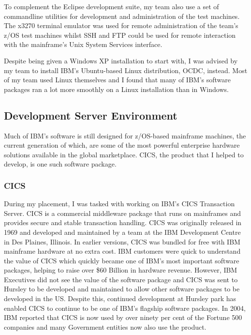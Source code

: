 \documentclass[12pt,a4paper]{article}
\begin{document}
To complement the Eclipse development suite, my team also use a set of
commandline utilities for development and administration of the test machines.
The x3270 \cite{x3270Site} terminal emulator was used for remote administration
of the team's z/OS test machines whilst SSH and FTP could be used for remote
interaction with the mainframe's Unix System Services interface.

Despite being given a Windows XP installation to start with, I was advised by my
team to install IBM's Ubuntu-based Linux distribution, OCDC, instead. Most of my
team used Linux themselves and I found that many of IBM's software packages ran
a lot more smoothly on a Linux installation than in Windows.

\subsection{Development Server Environment}
%
Much of IBM's software is still designed for z/OS-based mainframe machines, the 
current generation of which, are some of the most powerful enterprise hardware
solutions available in the global marketplace. CICS, the product that I helped
to develop, is one such software package.

\subsubsection{CICS}
During my placement, I was tasked with working on IBM's CICS Transaction Server.
CICS is a commercial middleware package that runs on mainframes and provides
secure and stable transaction handling. CICS was originally released in 1969 and
developed and maintained by a team at the IBM Development Centre in Des Plaines,
Illinois. In earlier versions, CICS was bundled for free with IBM mainframe
hardware at no extra cost. IBM customers were quick to understand the value of
CICS which quickly became one of IBM's most important software packages, helping
to raise over \$60 Billion in hardware revenue. However, IBM Executives did not
see the value of the software package and CICS was sent to Hursley to be
developed and maintained to allow other software packages to be developed in the
US. Despite this, continued development at Hursley park has enabled CICS to
continue to be one of IBM's flagship software packages.  In 2004, IBM reported
that CICS is now used by over ninety per cent of the Fortune 500 companies and many
Government entities now also use the product.
\end{document}
